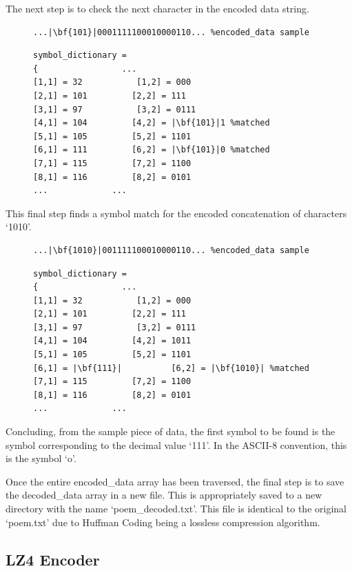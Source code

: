 \documentclass[12pt]{article}
\begin{document}
The next step is to check the next character in the encoded data string.

\begin{figure}[H]
\begin{verbatim}
...|\bf{101}|0001111100010000110... %encoded_data sample
\end{verbatim}
\begin{verbatim}
symbol_dictionary =
{				  ...
[1,1] = 32			 [1,2] = 000
[2,1] = 101			[2,2] = 111
[3,1] = 97			 [3,2] = 0111
[4,1] = 104			[4,2] = |\bf{101}|1 %matched
[5,1] = 105			[5,2] = 1101
[6,1] = 111			[6,2] = |\bf{101}|0 %matched
[7,1] = 115			[7,2] = 1100
[8,1] = 116			[8,2] = 0101
...				...
\end{verbatim} 
\end{figure}

This final step finds a symbol match for the encoded concatenation of characters `1010'.

\begin{figure}[H]
\begin{verbatim}
...|\bf{1010}|001111100010000110... %encoded_data sample
\end{verbatim}
\begin{verbatim}
symbol_dictionary =
{				  ...
[1,1] = 32			 [1,2] = 000
[2,1] = 101			[2,2] = 111
[3,1] = 97			 [3,2] = 0111
[4,1] = 104			[4,2] = 1011
[5,1] = 105			[5,2] = 1101
[6,1] = |\bf{111}|			[6,2] = |\bf{1010}| %matched
[7,1] = 115			[7,2] = 1100
[8,1] = 116			[8,2] = 0101
...				...
\end{verbatim} 
\end{figure}

Concluding, from the sample piece of data, the first symbol to be found is the symbol corresponding to the decimal value `111'. In the ASCII-8 convention, this is the symbol `o'.

Once the entire encoded\_data array has been traversed, the final step is to save the decoded\_data array in a new file. This is appropriately saved to a new directory with the name `poem\_decoded.txt'. This file is identical to the original `poem.txt' due to Huffman Coding being a lossless compression algorithm.

\subsection{LZ4 Encoder}{\label{sec_lz4_encoder}}
\end{document}
